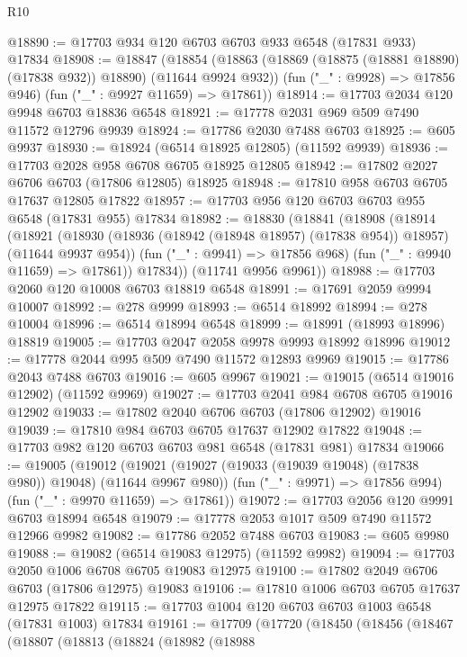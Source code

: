 \begin{lexlean}{R10}
\begin{coremodule}
@18890 := @17703 @934 @120 @6703 @6703 @933 @6548 (@17831 @933) @17834
@18908 := @18847
    (@18854
      (@18863 (@18869 (@18875 (@18881 @18890) (@17838 @932)) @18890) (@11644 @9924 @932))
      (fun ("_" : @9928) => @17856 @946)
      (fun ("_" : @9927 @11659) => @17861))
@18914 := @17703 @2034 @120 @9948 @6703 @18836 @6548
@18921 := @17778 @2031 @969 @509 @7490 @11572 @12796 @9939
@18924 := @17786 @2030 @7488 @6703
@18925 := @605 @9937
@18930 := @18924 (@6514 @18925 @12805) (@11592 @9939)
@18936 := @17703 @2028 @958 @6708 @6705 @18925 @12805
@18942 := @17802 @2027 @6706 @6703 (@17806 @12805) @18925
@18948 := @17810 @958 @6703 @6705 @17637 @12805 @17822
@18957 := @17703 @956 @120 @6703 @6703 @955 @6548 (@17831 @955) @17834
@18982 := @18830
    (@18841
      (@18908
        (@18914
          (@18921
            (@18930 (@18936 (@18942 (@18948 @18957) (@17838 @954)) @18957) (@11644 @9937 @954))
            (fun ("_" : @9941) => @17856 @968)
            (fun ("_" : @9940 @11659) => @17861))
          @17834))
      (@11741 @9956 @9961))
@18988 := @17703 @2060 @120 @10008 @6703 @18819 @6548
@18991 := @17691 @2059 @9994 @10007
@18992 := @278 @9999
@18993 := @6514 @18992
@18994 := @278 @10004
@18996 := @6514 @18994 @6548
@18999 := @18991 (@18993 @18996) @18819
@19005 := @17703 @2047 @2058 @9978 @9993 @18992 @18996
@19012 := @17778 @2044 @995 @509 @7490 @11572 @12893 @9969
@19015 := @17786 @2043 @7488 @6703
@19016 := @605 @9967
@19021 := @19015 (@6514 @19016 @12902) (@11592 @9969)
@19027 := @17703 @2041 @984 @6708 @6705 @19016 @12902
@19033 := @17802 @2040 @6706 @6703 (@17806 @12902) @19016
@19039 := @17810 @984 @6703 @6705 @17637 @12902 @17822
@19048 := @17703 @982 @120 @6703 @6703 @981 @6548 (@17831 @981) @17834
@19066 := @19005
    (@19012
      (@19021 (@19027 (@19033 (@19039 @19048) (@17838 @980)) @19048) (@11644 @9967 @980))
      (fun ("_" : @9971) => @17856 @994)
      (fun ("_" : @9970 @11659) => @17861))
@19072 := @17703 @2056 @120 @9991 @6703 @18994 @6548
@19079 := @17778 @2053 @1017 @509 @7490 @11572 @12966 @9982
@19082 := @17786 @2052 @7488 @6703
@19083 := @605 @9980
@19088 := @19082 (@6514 @19083 @12975) (@11592 @9982)
@19094 := @17703 @2050 @1006 @6708 @6705 @19083 @12975
@19100 := @17802 @2049 @6706 @6703 (@17806 @12975) @19083
@19106 := @17810 @1006 @6703 @6705 @17637 @12975 @17822
@19115 := @17703 @1004 @120 @6703 @6703 @1003 @6548 (@17831 @1003) @17834
@19161 := @17709
    (@17720
      (@18450
        (@18456
          (@18467
            (@18807
              (@18813
                (@18824
                  (@18982
                    (@18988

\end{coremodule}
\end{lexlean}
